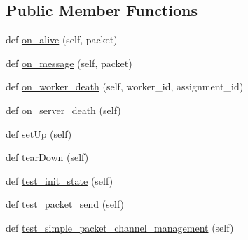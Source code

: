 \subsection*{Public Member Functions}
\begin{DoxyCompactItemize}
\item 
def \hyperlink{classparlai_1_1mturk_1_1core_1_1dev_1_1test_1_1test__socket__manager_1_1TestSocketManagerRoutingFunctionality_ad639ce0d77b665749df4a717dadc1ff3}{on\+\_\+alive} (self, packet)
\item 
def \hyperlink{classparlai_1_1mturk_1_1core_1_1dev_1_1test_1_1test__socket__manager_1_1TestSocketManagerRoutingFunctionality_ab3c16bc3a5770be76e25d72333ef5d36}{on\+\_\+message} (self, packet)
\item 
def \hyperlink{classparlai_1_1mturk_1_1core_1_1dev_1_1test_1_1test__socket__manager_1_1TestSocketManagerRoutingFunctionality_a072fcf8779187e200c48e011c9df61fa}{on\+\_\+worker\+\_\+death} (self, worker\+\_\+id, assignment\+\_\+id)
\item 
def \hyperlink{classparlai_1_1mturk_1_1core_1_1dev_1_1test_1_1test__socket__manager_1_1TestSocketManagerRoutingFunctionality_aa0be4af1e2826092404690672b60dd5a}{on\+\_\+server\+\_\+death} (self)
\item 
def \hyperlink{classparlai_1_1mturk_1_1core_1_1dev_1_1test_1_1test__socket__manager_1_1TestSocketManagerRoutingFunctionality_aca0a2eed97b70453c040558a3a4d1249}{set\+Up} (self)
\item 
def \hyperlink{classparlai_1_1mturk_1_1core_1_1dev_1_1test_1_1test__socket__manager_1_1TestSocketManagerRoutingFunctionality_abca414142f3b78c4bb8c5c1202e497d1}{tear\+Down} (self)
\item 
def \hyperlink{classparlai_1_1mturk_1_1core_1_1dev_1_1test_1_1test__socket__manager_1_1TestSocketManagerRoutingFunctionality_abab7af1d4f1633faa8d96d11e8563093}{test\+\_\+init\+\_\+state} (self)
\item 
def \hyperlink{classparlai_1_1mturk_1_1core_1_1dev_1_1test_1_1test__socket__manager_1_1TestSocketManagerRoutingFunctionality_ad4a3afda261c85447c2b6fa0907592b6}{test\+\_\+packet\+\_\+send} (self)
\item 
def \hyperlink{classparlai_1_1mturk_1_1core_1_1dev_1_1test_1_1test__socket__manager_1_1TestSocketManagerRoutingFunctionality_a9403b843beeef51f5eba050796862f9e}{test\+\_\+simple\+\_\+packet\+\_\+channel\+\_\+management} (self)
\end{DoxyCompactItemize}
